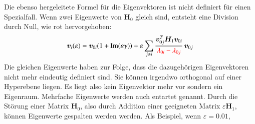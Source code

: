 Die ebenso hergeleitete Formel  für die Eigenvektoren ist nicht definiert für einen Spezialfall.
Wenn zwei Eigenwerte von $\bm H_0$ gleich sind, entsteht eine Division durch Null, wie rot hervorgehoben:
\begin{equation*} %
    \bm v_i(\varepsilon)
    =
    \bm v_{0i} ( 1+ \mathrm{Im}(\varepsilon \gamma)) + \varepsilon \sum_{j \neq i}
    \frac{\bm v_{0j}^T \bm H_1 \bm v_{0i}}{\RD{\lambda_{0i} - \lambda_{0j}}}
    \, \bm v_{0j}
\end{equation*}
Die gleichen Eigenwerte haben zur Folge, dass die dazugehörigen Eigenvektoren nicht mehr eindeutig definiert sind.
Sie können irgendwo orthogonal auf einer Hyperebene liegen.
Es liegt also kein Eigenvektor mehr vor sondern ein Eigenraum.
Mehrfache Eigenwerte werden auch entartet genannt.
Durch die Störung einer Matrix $\bm H_0$, also durch Addition einer geeigneten Matrix $\varepsilon \bm H_1$, können Eigenwerte gespalten werden werden.
Als Beispiel, wenn $\varepsilon = 0.01$,
